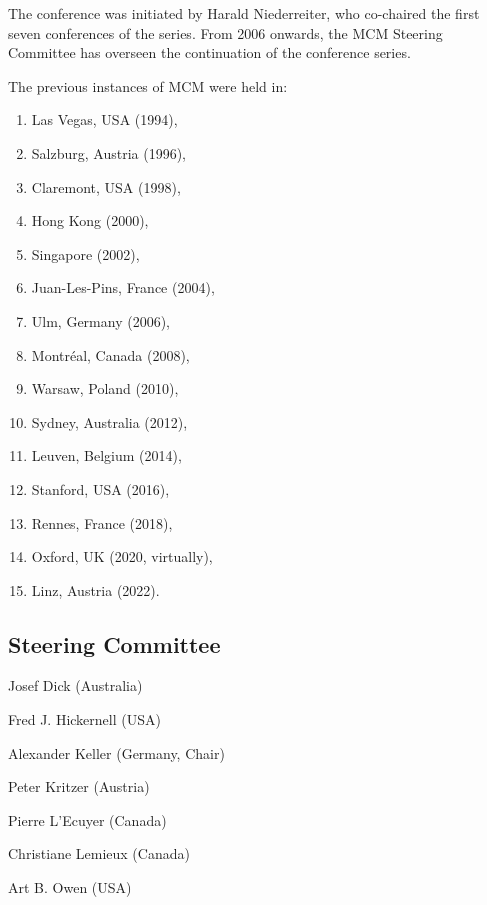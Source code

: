 The conference was initiated by Harald Niederreiter, who co-chaired the
first seven conferences of the series. From 2006 onwards, the MCM Steering Committee has
overseen the continuation of the conference series.

The previous instances of MCM were held in:
\begin{enumerate}
\item Las Vegas, USA (1994),
\item Salzburg, Austria (1996),
\item Claremont, USA (1998),
\item Hong Kong (2000),
\item Singapore (2002),
\item Juan-Les-Pins, France (2004),
\item Ulm, Germany (2006),
\item Montr\'{e}al, Canada (2008),
\item Warsaw, Poland (2010),
\item Sydney, Australia (2012),
\item Leuven, Belgium (2014),
\item Stanford, USA (2016),
\item Rennes, France (2018),
\item Oxford, UK (2020, virtually),
\item Linz, Austria (2022).
\end{enumerate}

\newpage
\subsection{Steering Committee}

\setlength{\columnsep}{1cm}
\begin{multicols}{2}
\raggedright

Josef Dick (Australia)

Fred J. Hickernell (USA)

Alexander Keller (Germany, Chair)

Peter Kritzer (Austria)

Pierre L'Ecuyer (Canada)

Christiane Lemieux (Canada)

Art B. Owen (USA)


\end{multicols}

